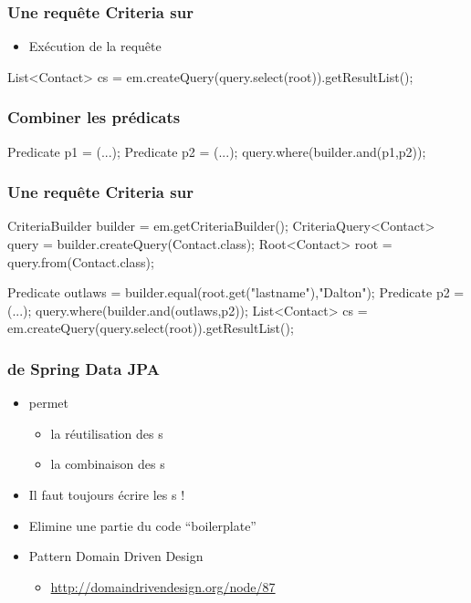 \begin{frame}[fragile]
 \frametitle{Une requête Criteria sur }

 \begin{itemize}
  \item Exécution de la requête
 \end{itemize}

 \begin{javacode}
List<Contact> cs = em.createQuery(query.select(root)).getResultList();
 \end{javacode}
\end{frame}

\begin{frame}[fragile]
 \frametitle{Combiner les prédicats}

 \begin{javacode}
Predicate p1 = (...);
Predicate p2 = (...);
query.where(builder.and(p1,p2));
 \end{javacode}
\end{frame}

\begin{frame}[fragile]
 \frametitle{Une requête Criteria sur }

 \begin{javacode}
CriteriaBuilder builder = em.getCriteriaBuilder();
CriteriaQuery<Contact> query = builder.createQuery(Contact.class);
Root<Contact> root = query.from(Contact.class);
    
Predicate outlaws = builder.equal(root.get("lastname"),"Dalton");
Predicate p2 = (...);
query.where(builder.and(outlaws,p2));
List<Contact> cs = em.createQuery(query.select(root)).getResultList();
 \end{javacode}
\end{frame}

\begin{frame}
 \frametitle{ de Spring Data JPA}

 \begin{itemize}
  \item {} permet
  \begin{itemize}
   \item la réutilisation des s
   \item la combinaison des s
  \end{itemize}
  \item Il faut toujours écrire les s !
  \item Elimine une partie du code ``boilerplate''
  \item Pattern Domain Driven Design
  \begin{itemize}
   \item \url{http://domaindrivendesign.org/node/87}
  \end{itemize}
 \end{itemize}

\end{frame}

